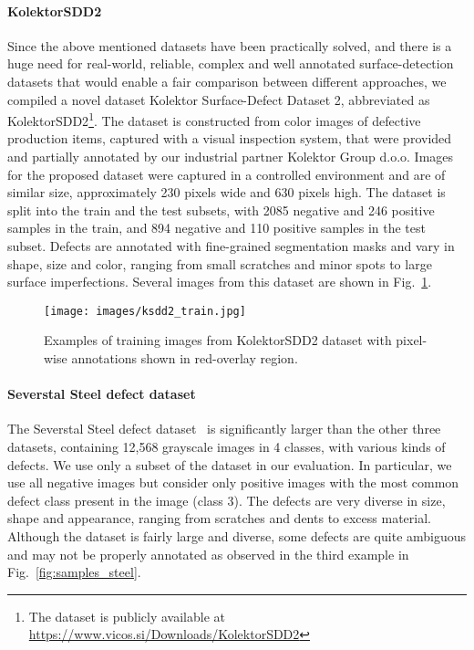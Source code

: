 \paragraph{\textbf{KolektorSDD2}}
Since the above mentioned datasets have been practically solved, and there is a huge need for real-world, reliable, complex and well annotated surface-detection datasets that would enable a fair comparison between different approaches, we compiled a novel dataset Kolektor Surface-Defect Dataset 2, abbreviated as KolektorSDD2\footnote{The dataset is publicly available at \url{https://www.vicos.si/Downloads/KolektorSDD2}}.
The dataset is constructed from color images of defective production items, captured with a visual inspection system, that were provided and partially annotated by our industrial partner Kolektor Group d.o.o.
Images for the proposed dataset were captured in a controlled environment and are of similar size, approximately 230 pixels wide and 630 pixels high. 
The dataset is split into the train and the test subsets, with 2085 negative and 246 positive samples in the train, and 894 negative and 110 positive samples in the test subset.
Defects are annotated with fine-grained segmentation masks and vary in shape, size and color, ranging from small scratches and minor spots to large surface imperfections.
Several images from this dataset are shown in Fig.~\ref{fig:samples_ksdd2_train}.

\begin{figure}%
    \begin{center}
        \texttt{[image: images/ksdd2\_train.jpg]}
    \end{center}
    \caption{Examples of training images from KolektorSDD2 
    dataset with pixel-wise annotations shown in red-overlay region.
    } 
    \label{fig:samples_ksdd2_train}
\end{figure}
\paragraph{\textbf{Severstal Steel defect dataset}}

The Severstal Steel defect dataset~\cite{SeverstalSteel2019} is significantly larger than the other three datasets, containing 12,568 grayscale images in 4 classes, with various kinds of defects. We use only a subset of the dataset in our evaluation. In particular, we use all negative images but consider only positive images with the most common defect class present in the image (class 3). 
The defects are very diverse in size, shape and appearance, ranging from scratches and dents to excess material.
Although the dataset is fairly large and diverse, some defects are quite ambiguous and may not be properly annotated as observed in the third example in Fig.~\ref{fig:samples_steel}.

